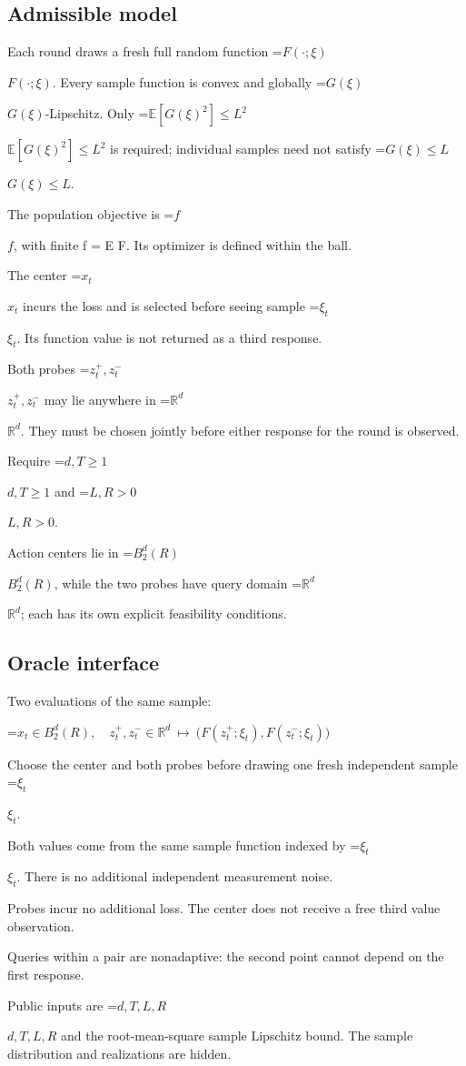 \documentclass[10pt,a4paper]{article}
\newcommand{\AtlasMath}[1]{\par\begingroup\centering\setbox0=\hbox{$\displaystyle #1$}\ifdim\wd0>1.4\linewidth\typeout{ATLAS WIDE FORMULA: \the\wd0}\fi\ifdim\wd0>\linewidth\resizebox{\linewidth}{!}{\box0}\else\box0\fi\par\endgroup}
\newcommand{\AtlasInlineMath}[1]{\begingroup\setbox0=\hbox{$#1$}\ifdim\wd0>.4\linewidth\endgroup\AtlasMath{#1}\else\endgroup$#1$\fi}
\begin{document}
\subsection{Admissible model}
Each round draws a fresh full random function \AtlasInlineMath{F(\cdot;\xi)}. Every sample function is convex and globally \AtlasInlineMath{G(\xi)}-Lipschitz. Only \AtlasInlineMath{\mathbb{E}[G(\xi)^2]\le L^2} is required; individual samples need not satisfy \AtlasInlineMath{G(\xi)\le L}.

The population objective is \AtlasInlineMath{f}, with finite f = E F. Its optimizer is defined within the ball.

The center \AtlasInlineMath{x_t} incurs the loss and is selected before seeing sample \AtlasInlineMath{\xi_t}. Its function value is not returned as a third response.

Both probes \AtlasInlineMath{z_t^+,z_t^-} may lie anywhere in \AtlasInlineMath{\mathbb R^d}. They must be chosen jointly before either response for the round is observed.

Require \AtlasInlineMath{d,T\ge1} and \AtlasInlineMath{L,R>0}.

Action centers lie in \AtlasInlineMath{B_2^d(R)}, while the two probes have query domain \AtlasInlineMath{\mathbb{R}^d}; each has its own explicit feasibility conditions.

\subsection{Oracle interface}
Two evaluations of the same sample:


\AtlasMath{x_t\in B_2^d(R),\quad z_t^+,z_t^-\in\mathbb{R}^d\ \longmapsto\ \big(F(z_t^+;\xi_t),F(z_t^-;\xi_t)\big)}


Choose the center and both probes before drawing one fresh independent sample \AtlasInlineMath{\xi_t}.

Both values come from the same sample function indexed by \AtlasInlineMath{\xi_t}. There is no additional independent measurement noise.

Probes incur no additional loss. The center does not receive a free third value observation.

Queries within a pair are nonadaptive: the second point cannot depend on the first response.

Public inputs are \AtlasInlineMath{d,T,L,R} and the root-mean-square sample Lipschitz bound. The sample distribution and realizations are hidden.
\end{document}
